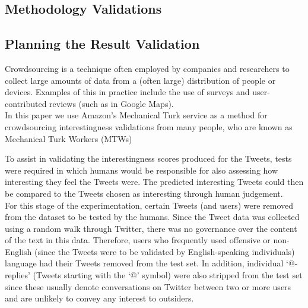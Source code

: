 \begin{enumerate}
\section{Methodology Validations}

\subsection{Planning the Result Validation}
Crowdsourcing is a technique often employed by companies and researchers to collect large amounts of data from a (often large) distribution of people or devices. Examples of this in practice include the use of surveys and user-contributed reviews (such as in Google Maps).\\
In this paper we use Amazon's Mechanical Turk service as a method for crowdsourcing interestingness validations from many people, who are known as Mechanical Turk Workers (MTWs) 

To assist in validating the interestingness scores produced for the Tweets, tests were required in which humans would be responsible for also assessing how interesting they feel the Tweets were. The predicted interesting Tweets could then be compared to the Tweets chosen as interesting through human judgement.\\
For this stage of the experimentation, certain Tweets (and users) were removed from the dataset to be tested by the humans. Since the Tweet data was collected using a random walk through Twitter, there was no governance over the content of the text in this data. Therefore, users who frequently used offensive or non-English (since the Tweets were to be validated by English-speaking individuals) language had their Tweets removed from the test set. In addition, individual `@-replies' (Tweets starting with the `@' symbol) were also stripped from the test set since these usually denote conversations on Twitter between two or more users and are unlikely to convey any interest to outsiders.



\end{enumerate}
